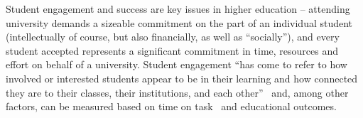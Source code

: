 \documentclass[sigconf]{acmart}
\begin{document}

Student engagement and success are key issues in higher education -- attending university demands a sizeable commitment on the part of an individual student (intellectually of course, but also financially, as well as ``socially''), and every student accepted represents a significant commitment in time, resources and effort on behalf of a university. Student engagement ``has come to refer to how involved or interested students appear to be in their learning and how connected they are to their classes, their institutions, and each other''~\citep[p.~38]{Axelson2010} and, among other factors, can be measured based on time on task~\cite{kuh2009national} and educational outcomes.
\end{document}
